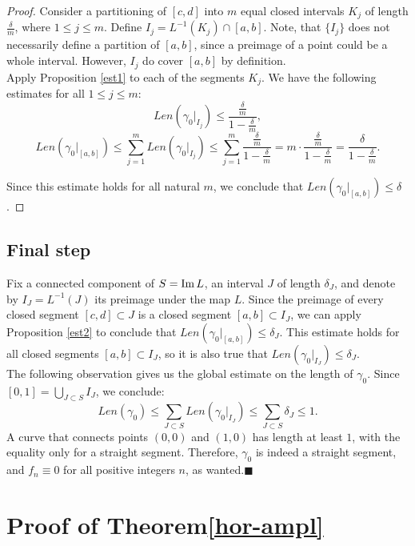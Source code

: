 \documentclass{article}
\theoremstyle{definition}
\newcommand{\im}{\mathop{\rm Im}\nolimits}
\newcommand{\Le}{\leqslant}
\newcommand{\lims}{\limits}
\newcommand{\eq}{\equiv}
\begin{document}
    \begin{proof}[Proof]
        Consider a partitioning of $[c, d]$ into $m$ equal closed intervals $K_j$ of length $\frac{\delta}{m}$, where $1 \Le j \Le m$. Define $I_j = L^{-1}(K_j)\cap[a, b]$. Note, that $\{I_j\}$ does not necessarily define a partition of $[a, b]$, since a preimage of a point could be a whole interval. However, $I_j$ do cover $[a, b]$ by definition.\\
    
        Apply Proposition \ref{est1} to each of the    segments $K_j$. We have the following estimates for all $1\Le j\Le m$:
        $$
        Len(\gamma_0|_{I_j})\Le \frac{\frac{\delta}{m}}{1 - \frac{\delta}{m}},
        $$
        $$
        Len(\gamma_0|_{[a, b]})\Le\sum_{j=1}^mLen(\gamma_0|_{I_j})\Le \sum_{j=1}^m\frac{\frac{\delta}{m}}{1 - \frac{\delta}{m}} = m\cdot \frac{\frac{\delta}{m}}{1 - \frac{\delta}{m}} = \frac{\delta}{1 - \frac{\delta}{m}}.
        $$
    
        Since this estimate holds for all natural $m$, we conclude that $Len(\gamma_0|_{[a, b]})\Le\delta$.
    \end{proof}
    
    \subsection{Final step}
        Fix a connected component of $S=\im L$, an interval $J$ of length $\delta_J$, and denote by $I_J = L^{-1}(J)$ its preimage under the map $L$.
        Since the preimage of every closed segment $[c, d]\subset J$ is a closed segment $[a, b]\subset I_J$, we can apply Proposition \ref{est2} to conclude that $Len(\gamma_0|_{[a, b]})\Le\delta_J$. This estimate holds for all closed segments $[a,b]\subset I_J$, so it is also true that $Len(\gamma_0|_{I_J})\Le\delta_J$.\\
        
        The following observation gives us the global estimate on the length of $\gamma_0$. Since $[0, 1] = \bigcup\lims_{J\subset S}I_J$, we conclude:
        $$
        Len(\gamma_0) \Le \sum_{J\subset S}Len(\gamma_0|_{I_J})\Le \sum_{J\subset S}\delta_J \Le 1.
        $$
        A curve that connects points $(0, 0)$ and $(1, 0)$ has length at least $1$, with the equality only for a straight segment. Therefore, $\gamma_0$ is indeed a straight segment, and $f_n\eq0$ for all positive integers $n$, as wanted.\quad$\blacksquare$

\section{Proof of Theorem\ref{hor-ampl}}
\label{proof2}
\end{document}
